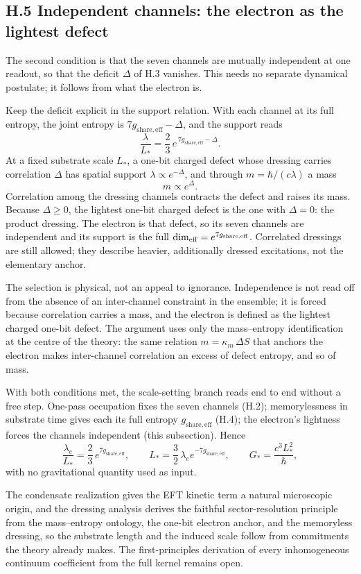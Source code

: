 \documentclass[11pt]{article}
\begin{document}
\subsection*{H.5 Independent channels: the electron as the lightest defect}

The second condition is that the seven channels are mutually independent at one readout, so that the deficit $\Delta$ of H.3 vanishes. This needs no separate dynamical postulate; it follows from what the electron is.

Keep the deficit explicit in the support relation. With each channel at its full entropy, the joint entropy is $7g_{\mathrm{share,eff}}-\Delta$, and the support reads
\[
\frac{\lambda}{L_*}=\frac23\,e^{\,7g_{\mathrm{share,eff}}-\Delta}.
\]
At a fixed substrate scale $L_*$, a one-bit charged defect whose dressing carries correlation $\Delta$ has spatial support $\lambda\propto e^{-\Delta}$, and through $m=\hbar/(c\lambda)$ a mass
\[
m\propto e^{\Delta}.
\]
Correlation among the dressing channels contracts the defect and raises its mass. Because $\Delta\ge 0$, the lightest one-bit charged defect is the one with $\Delta=0$: the product dressing. The electron is that defect, so its seven channels are independent and its support is the full $\dim_{\rm eff}=e^{7g_{\mathrm{share,eff}}}$. Correlated dressings are still allowed; they describe heavier, additionally dressed excitations, not the elementary anchor.

The selection is physical, not an appeal to ignorance. Independence is not read off from the absence of an inter-channel constraint in the ensemble; it is forced because correlation carries a mass, and the electron is defined as the lightest charged one-bit defect. The argument uses only the mass--entropy identification at the centre of the theory: the same relation $m=\kappa_m\,\Delta S$ that anchors the electron makes inter-channel correlation an excess of defect entropy, and so of mass.

With both conditions met, the scale-setting branch reads end to end without a free step. One-pass occupation fixes the seven channels (H.2); memorylessness in substrate time gives each its full entropy $g_{\mathrm{share,eff}}$ (H.4); the electron's lightness forces the channels independent (this subsection). Hence
\[
\frac{\lambda_e}{L_*}=\frac23\,e^{7g_{\mathrm{share,eff}}},
\qquad
L_*=\frac32\,\lambda_e e^{-7g_{\mathrm{share,eff}}},
\qquad
G_*=\frac{c^3L_*^2}{\hbar},
\]
with no gravitational quantity used as input.

The condensate realization gives the EFT kinetic term a natural microscopic origin, and the dressing analysis derives the faithful sector-resolution principle from the mass--entropy ontology, the one-bit electron anchor, and the memoryless dressing, so the substrate length and the induced scale follow from commitments the theory already makes. The first-principles derivation of every inhomogeneous continuum coefficient from the full kernel remains open.
\end{document}
